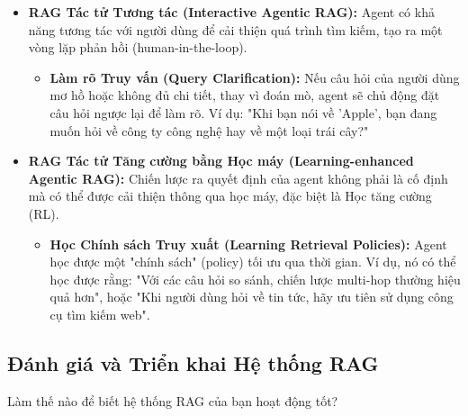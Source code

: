 \begin{itemize}
\begin{itemize}
        \item \textbf{RAG Tác tử Tương tác (Interactive Agentic RAG):} 
        Agent có khả năng tương tác với người dùng để cải thiện quá trình tìm kiếm, tạo ra một vòng lặp phản hồi (human-in-the-loop).
        \begin{itemize}
            \item \textbf{Làm rõ Truy vấn (Query Clarification):} 
            Nếu câu hỏi của người dùng mơ hồ hoặc không đủ chi tiết, thay vì đoán mò, agent sẽ chủ động đặt câu hỏi ngược lại để làm rõ. Ví dụ: "Khi bạn nói về 'Apple', bạn đang muốn hỏi về công ty công nghệ hay về một loại trái cây?"
        \end{itemize}

        \item \textbf{RAG Tác tử Tăng cường bằng Học máy (Learning-enhanced Agentic RAG):} 
        Chiến lược ra quyết định của agent không phải là cố định mà có thể được cải thiện thông qua học máy, đặc biệt là Học tăng cường (RL).
        \begin{itemize}
            \item \textbf{Học Chính sách Truy xuất (Learning Retrieval Policies):} 
            Agent học được một "chính sách" (policy) tối ưu qua thời gian. Ví dụ, nó có thể học được rằng: "Với các câu hỏi so sánh, chiến lược multi-hop thường hiệu quả hơn", hoặc "Khi người dùng hỏi về tin tức, hãy ưu tiên sử dụng công cụ tìm kiếm web".
        \end{itemize}
    \end{itemize}
\end{itemize}

\subsection{Đánh giá và Triển khai Hệ thống RAG}
\label{ssec:rag_evaluation_production}
Làm thế nào để biết hệ thống RAG của bạn hoạt động tốt?

